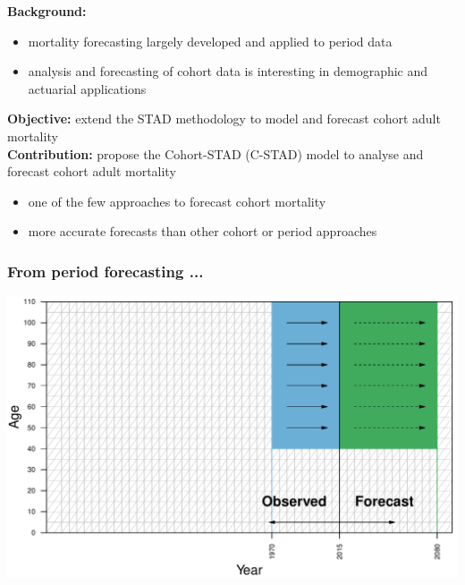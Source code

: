 \documentclass[12pt, xcolor=table]{beamer}  %
\begin{document}
\begin{frame} 
	\textbf{Background:}
	\begin{itemize}
		\setlength\itemsep{0.5em}
		\item mortality forecasting largely developed and applied to period data  
		\item analysis and forecasting of cohort data is interesting in demographic and actuarial applications
	\end{itemize}
	\bigskip \pause
	\textbf{Objective:} extend the STAD methodology to model and forecast cohort adult mortality
	\\ \bigskip \pause
	\textbf{Contribution:} propose the Cohort-STAD (C-STAD) model to analyse and forecast cohort adult mortality
	\begin{itemize}
		\setlength\itemsep{0.5em}
		\item one of the few approaches to forecast cohort mortality 
		\item more accurate forecasts than other cohort or period approaches
	\end{itemize}
	
\end{frame}


\begin{frame}\frametitle{From period forecasting ...}
	
	\vspace{0.4cm}
	\begin{center}
		\includegraphics[scale=0.56]{Figures/Ch4/F1_PERIOD}
	\end{center}
	
\end{frame}
\end{document}
